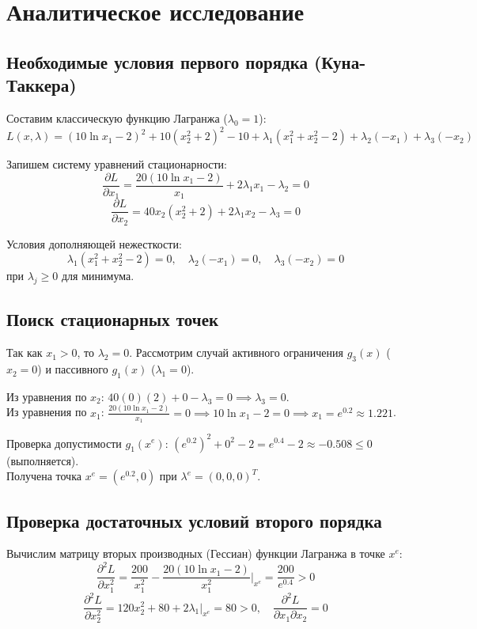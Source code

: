 \documentclass[a4paper,12pt]{article}
\begin{document}
\section{Аналитическое исследование}

\subsection{Необходимые условия первого порядка (Куна-Таккера)}
Составим классическую функцию Лагранжа ($\lambda_0=1$):
$$L(x, \lambda) = (10\ln x_1 - 2)^2 + 10(x_2^2 + 2)^2 - 10 + \lambda_1(x_1^2 + x_2^2 - 2) + \lambda_2(-x_1) + \lambda_3(-x_2)$$

Запишем систему уравнений стационарности:
$$\frac{\partial L}{\partial x_1} = \frac{20(10\ln x_1 - 2)}{x_1} + 2\lambda_1 x_1 - \lambda_2 = 0$$
$$\frac{\partial L}{\partial x_2} = 40x_2(x_2^2 + 2) + 2\lambda_1 x_2 - \lambda_3 = 0$$

Условия дополняющей нежесткости:
$$\lambda_1(x_1^2 + x_2^2 - 2) = 0, \quad \lambda_2(-x_1) = 0, \quad \lambda_3(-x_2) = 0$$
при $\lambda_j \ge 0$ для минимума.

\subsection{Поиск стационарных точек}
Так как $x_1 > 0$, то $\lambda_2 = 0$. Рассмотрим случай активного ограничения $g_3(x)$ ($x_2 = 0$) и пассивного $g_1(x)$ ($\lambda_1 = 0$).

Из уравнения по $x_2$: $40(0)(2) + 0 - \lambda_3 = 0 \implies \lambda_3 = 0$. \\
Из уравнения по $x_1$: $\frac{20(10\ln x_1 - 2)}{x_1} = 0 \implies 10\ln x_1 - 2 = 0 \implies x_1 = e^{0.2} \approx 1.221$.

Проверка допустимости $g_1(x^e)$: $(e^{0.2})^2 + 0^2 - 2 = e^{0.4} - 2 \approx -0.508 \le 0$ (выполняется).\\
Получена точка $x^e = (e^{0.2}, 0)$ при $\lambda^e = (0, 0, 0)^T$.

\subsection{Проверка достаточных условий второго порядка}
Вычислим матрицу вторых производных (Гессиан) функции Лагранжа в точке $x^e$:
$$\frac{\partial^2 L}{\partial x_1^2} = \frac{200}{x_1^2} - \frac{20(10\ln x_1 - 2)}{x_1^2} \Big|_{x^e} = \frac{200}{e^{0.4}} > 0$$
$$\frac{\partial^2 L}{\partial x_2^2} = 120x_2^2 + 80 + 2\lambda_1 \Big|_{x^e} = 80 > 0, \quad \frac{\partial^2 L}{\partial x_1 \partial x_2} = 0$$
\end{document}
